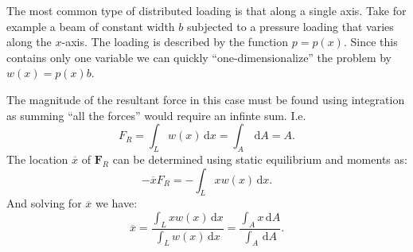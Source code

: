 The most common type of distributed loading is that along a single axis. Take for example a beam of constant width $b$ subjected to a pressure loading that varies along the $x$-axis. The loading is described by the function $p = p(x)$. Since this contains only one variable we can quickly ``one-dimensionalize'' the problem by $w(x) = p(x) b$. 

The magnitude of the resultant force in this case must be found using integration as summing ``all the forces'' would require an infinte sum. I.e.
\[ 
F_R = \int_{L} w(x) \, \mathrm{d}x = \int_A \, \mathrm{d}A = A
.\]
The location $\overline{x}$ of $\textbf{F}_R$ can be determined using static equilibrium and moments as:
\[ 
- \overline{x} F_R = - \int_L x w(x) \, \mathrm{d}x 
.\]
And solving for $\overline{x}$ we have:
\[ 
\overline{x} = \frac{\int_L x w (x) \, \mathrm{d}x}{\int_L w(x) \, \mathrm{d}x} = \frac{\int_A x \, \mathrm{d}A}{\int_A \, \mathrm{d}A}
.\]
